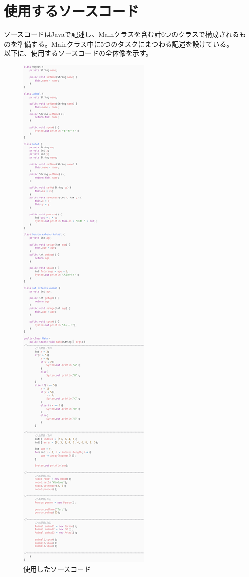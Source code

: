 \documentclass[paper=a4paper,fontsize=10pt]{jlreq}
\begin{document}
  \section{使用するソースコード}
    ソースコードはJavaで記述し、Mainクラスを含む計6つのクラスで構成されるものを準備する。Mainクラス中に5つのタスクにまつわる記述を設けている。\\
    以下に、使用するソースコードの全体像を示す。
    \begin{figure}[h]
      \centering
      \includegraphics[height=\textheight]{carbon_clip_resized.png}
      \caption{使用したソースコード}
    \end{figure}
    \FloatBarrier
\end{document}
